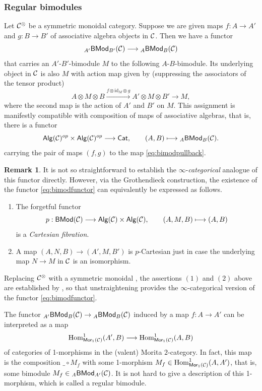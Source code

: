 \documentclass[10pt, reqno, twoside
, final
]{amsart}
\numberwithin{equation}{subsection}%
\theoremstyle{definition}
\theoremstyle{definition}
\theoremstyle{definition}
\theoremstyle{definition}
\theoremstyle{definition}
\theoremstyle{definition}
\theoremstyle{definition}
\theoremstyle{definition}
\theoremstyle{definition}
\theoremstyle{plain}
\theoremstyle{definition}
\theoremstyle{plain}
\theoremstyle{definition}
\theoremstyle{plain}
\theoremstyle{definition}
\newtheorem{rmk}[defn]{Remark}
\theoremstyle{definition}
\theoremstyle{plain}
\theoremstyle{plain}
\theoremstyle{definition}
\theoremstyle{plain}
\theoremstyle{plain}
\theoremstyle{plain}
\begin{document}
\subsubsection{Regular bimodules}\label{sec:reg-bimod}
Let $\mathcal{C}^{\otimes}$ be a symmetric monoidal category. Suppose we are given maps $f:A\rightarrow A'$ and $g:B\rightarrow B'$ of associative algebra objects in $\mathcal{C}$. Then we have a functor
\begin{equation}\label{eq:bimodpullback}
     {}_{A'}\mathsf{BMod}_{B'}(\mathcal{C}) \longrightarrow {}_A\mathsf{BMod}_B(\mathcal{C})
\end{equation}    
that carries an $A'$-$B'$-bimodule $M$ to the following  $A$-$B$-bimodule. Its  underlying object in $\mathcal{C}$ is also $M$ with action map given by (suppressing the associators of the tensor product)
\[ A\otimes M\otimes B \xrightarrow{f\otimes\mathrm{id}_M\otimes{g}} A'\otimes M\otimes B'\longrightarrow M ,\]
where the second map is the action of $A'$ and $B'$ on $M$. This assignment is manifestly compatible with composition of maps of associative algebras, that is, there is a functor 
\begin{equation}\label{eq:bimodfunctor} \mathsf{Alg}(\mathcal{C})^{op}\times\mathsf{Alg}(\mathcal{C})^{op}\longrightarrow \mathsf{Cat},\quad \quad (A,B)\longmapsto {}_A\mathsf{BMod}_B(\mathcal{C}).  \end{equation}
carrying the pair of maps $(f,g)$ to the map \eqref{eq:bimodpullback}.
\begin{rmk}
It is not so straightforward to establish the $\infty$-\emph{categorical} analogue of this functor directly. However, via the Grothendieck construction, the existence of the functor \eqref{eq:bimodfunctor} can equivalently be expressed as follows.
\begin{enumerate}[$(1)$]
    \item The forgetful functor 
    \[ p:\mathsf{BMod}(\mathcal{C})\longrightarrow \mathsf{Alg}(\mathcal{C})\times \mathsf{Alg}(\mathcal{C}),\quad\quad (A,M,B)\longmapsto (A,B) \]
    is a \emph{Cartesian fibration}.
    \item A map $(A,N,B)\rightarrow (A',M,B')$ is $p$-Cartesian just in case the underlying map $N\rightarrow M$ in $\mathcal{C}$ is an isomorphism. 
\end{enumerate}
Replacing $\mathcal{C}^{\otimes}$ with a symmetric monoidal \infcatt, the assertions $(1)$ and $(2)$ above are established by \cite[Corollary 4.3.3.3]{LurHA}, so that unstraightening provides the $\infty$-categorical version of the functor \eqref{eq:bimodfunctor}.
\end{rmk}
The functor ${}_{A'}\mathsf{BMod}_{B}(\mathcal{C}) \rightarrow {}_A\mathsf{BMod}_B(\mathcal{C}) $ induced by a map $f:A\rightarrow A'$ can be interpreted as a map 
\[  \mathrm{Hom}^1_{\mathsf{Mor}_1(\mathcal{C})}(A',B)\longrightarrow \mathrm{Hom}^1_{\mathsf{Mor}_1(\mathcal{C})}(A,B) \]
of categories of 1-morphisms in the (valent) Morita $2$-category. In fact, this map is the composition $\_\circ M_f$ with some 1-morphism $M_f\in \mathrm{Hom}^1_{\mathsf{Mor}_1(\mathcal{C})}(A,A')$, that is, some bimodule $M_f\in {}_A\mathsf{BMod}_{A'}(\mathcal{C})$. It is not hard to give a description of this 1-morphism, which is called a regular bimodule.
\end{document}
